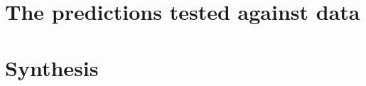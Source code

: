 \documentclass[11pt,a4paper]{article}
\begin{document}
\part{The predictions tested against data}\label{part:data}






\part{Synthesis}\label{part:synthesis}


\appendix







\end{document}
